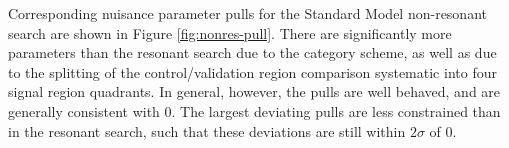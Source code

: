Corresponding nuisance parameter pulls for the Standard Model non-resonant search are shown in 
Figure \ref{fig:nonres-pull}. There are significantly more parameters than the resonant search due to the 
category scheme, as well as due to the splitting of the control/validation region comparison systematic into 
four signal region quadrants. In general, however, the pulls are well behaved, and are generally consistent 
with 0. The largest deviating pulls are less constrained than in the resonant search, such that these 
deviations are still within $2\sigma$ of $0$.

\begin{figure}[ht]
  \centering
  \hspace*{-2cm}


\end{figure}
